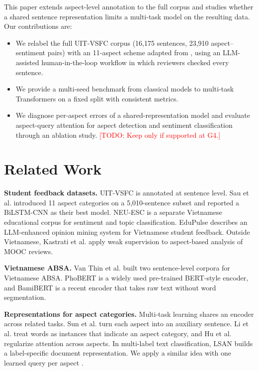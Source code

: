 \documentclass[9pt, conference, a4paper, compsocconf]{IEEEtran}
\newcommand{\TODO}[1]{\textcolor{red}{[TODO: #1]}}
\begin{document}
This paper extends aspect-level annotation to the full corpus and studies whether a shared sentence representation limits a multi-task model on the resulting data. Our contributions are:
\begin{itemize}
\item We relabel the full UIT-VSFC corpus (16,175 sentences, 23,910 aspect--sentiment pairs) with an 11-aspect scheme adapted from \cite{sau2021absa}, using an LLM-assisted human-in-the-loop workflow in which reviewers checked every sentence.
\item We provide a multi-seed benchmark from classical models to multi-task Transformers on a fixed split with consistent metrics.
\item We diagnose per-aspect errors of a shared-representation model and evaluate aspect-query attention for aspect detection and sentiment classification through an ablation study. \TODO{Keep only if supported at G4.}
\end{itemize}

\section{Related Work}
\textbf{Student feedback datasets.} UIT-VSFC \cite{nguyen2018uitvsfc} is annotated at sentence level. Sau et al. \cite{sau2021absa} introduced 11 aspect categories on a 5,010-sentence subset and reported a BiLSTM-CNN as their best model. NEU-ESC \cite{mai2025neuesc} is a separate Vietnamese educational corpus for sentiment and topic classification. EduPulse \cite{nguyen2026edupulse} describes an LLM-enhanced opinion mining system for Vietnamese student feedback. Outside Vietnamese, Kastrati et al. \cite{kastrati2020weakly} apply weak supervision to aspect-based analysis of MOOC reviews.

\textbf{Vietnamese ABSA.} Van Thin et al. \cite{vanthin2021corpora} built two sentence-level corpora for Vietnamese ABSA. PhoBERT \cite{nguyen2020phobert} is a widely used pre-trained BERT-style \cite{devlin2019bert} encoder, and BamiBERT \cite{nguyen2026bamibert} is a recent encoder that takes raw text without word segmentation.

\textbf{Representations for aspect categories.} Multi-task learning \cite{caruana1997multitask} shares an encoder across related tasks. Sun et al. \cite{sun2019auxiliary} turn each aspect into an auxiliary sentence. Li et al. \cite{li2020acmimlln} treat words as instances that indicate an aspect category, and Hu et al. \cite{hu2019can} regularize attention across aspects. In multi-label text classification, LSAN \cite{xiao2019lsan} builds a label-specific document representation. We apply a similar idea with one learned query per aspect \cite{vaswani2017attention}.
\end{document}
